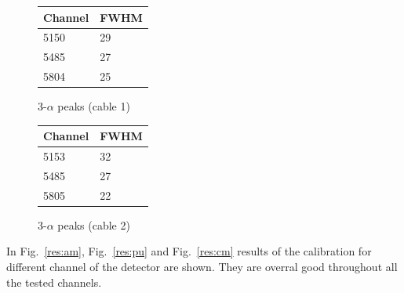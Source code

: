 \begin{figure}[h]
  \centering
  \begin{minipage}[b]{0.45\textwidth}
    \centering
  \begin{tabular}{ll}
    Channel & FWHM \\
    \midrule
    5150 & \num{29} \\
    5485 & \num{27} \\
    5804 & \num{25} \\
    \bottomrule
  \end{tabular}
  \caption{3-$\alpha$ peaks (cable 1)}
  \label{res:peaks:cab1}
  \end{minipage}
  \hfill
  \begin{minipage}[b]{0.45\textwidth}
    \centering
  \begin{tabular}{ll}
    Channel & FWHM \\
    \midrule
    5153 & \num{32} \\
    5485 & \num{27} \\
    5805 & \num{22} \\
    \bottomrule
  \end{tabular}
  \caption{3-$\alpha$ peaks (cable 2)}
  \label{res:peaks:cab2}
  \end{minipage}
\end{figure}


In Fig.~\ref{res:am}, Fig.~\ref{res:pu} and Fig.~\ref{res:cm} results of the calibration for different channel of the detector are shown. They are overral good throughout all the tested channels.


